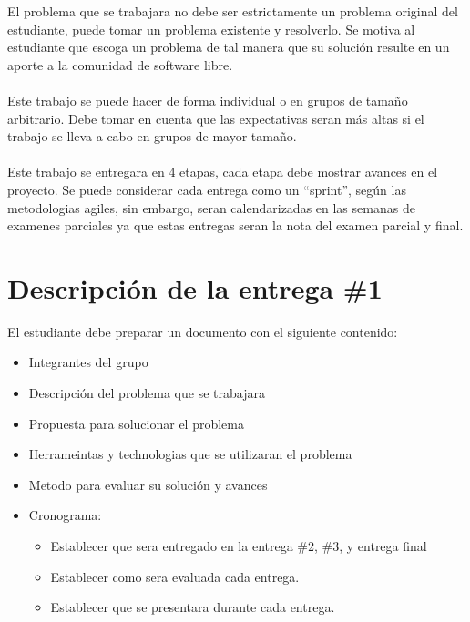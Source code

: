 \documentclass{article}
\begin{document}
El problema que se trabajara no debe ser estrictamente un problema original
del estudiante, puede tomar un problema existente y resolverlo. Se motiva al
estudiante que escoga un problema de tal manera que su soluci\'on resulte en
un aporte a la comunidad de software libre.
\\\\
Este trabajo se puede hacer de forma individual o en grupos de tama\~no
arbitrario. Debe tomar en cuenta que las expectativas seran m\'as altas
si el trabajo se lleva a cabo en grupos de mayor tama\~no.
\\\\
Este trabajo se entregara en 4 etapas, cada etapa debe mostrar avances
en el proyecto. Se puede considerar cada entrega como un ``sprint'', seg\'un
las metodologias agiles, sin embargo, seran calendarizadas en las semanas
de examenes parciales ya que estas entregas seran la nota del examen parcial
y final.

\section*{Descripci\'on de la entrega \#1}
El estudiante debe preparar un documento con el siguiente
contenido:
\begin{itemize}
        \item Integrantes del grupo
        \item Descripci\'on del problema que se trabajara
        \item Propuesta para solucionar el problema
        \item Herrameintas y technologias que se utilizaran el problema
        \item Metodo para evaluar su soluci\'on y avances
        \item {
                Cronograma:
                \begin{itemize}
                        \item{
                                Establecer que sera entregado
                                en la entrega \#2, \#3, y entrega final
                        }
                        \item{
                                Establecer como sera evaluada cada
                                entrega.
                        }
                        \item{
                                Establecer que se presentara durante
                                cada entrega.
                        }
                \end{itemize}
        }
\end{itemize}
\end{document}
